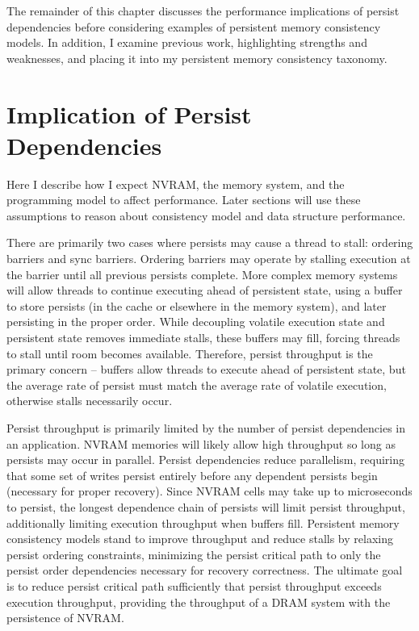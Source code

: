 The remainder of this chapter discusses the performance implications of persist dependencies before considering examples of persistent memory consistency models.
In addition, I examine previous work, highlighting strengths and weaknesses, and placing it into my persistent memory consistency taxonomy.

\section{Implication of Persist Dependencies}
\label{sec:PMC:Performance}

Here I describe how I expect NVRAM, the memory system, and the programming model to affect performance.
Later sections will use these assumptions to reason about consistency model and data structure performance.

There are primarily two cases where persists may cause a thread to stall: ordering barriers and sync barriers.
Ordering barriers may operate by stalling execution at the barrier until all previous persists complete.
More complex memory systems will allow threads to continue executing ahead of persistent state, using a buffer to store persists (in the cache or elsewhere in the memory system), and later persisting in the proper order.
While decoupling volatile execution state and persistent state removes immediate stalls, these buffers may fill, forcing threads to stall until room becomes available.
Therefore, persist throughput is the primary concern -- buffers allow threads to execute ahead of persistent state, but the average rate of persist must match the average rate of volatile execution, otherwise stalls necessarily occur.

Persist throughput is primarily limited by the number of persist dependencies in an application.
NVRAM memories will likely allow high throughput so long as persists may occur in parallel.
Persist dependencies reduce parallelism, requiring that some set of writes persist entirely before any dependent persists begin (necessary for proper recovery).
Since NVRAM cells may take up to microseconds to persist, the longest dependence chain of persists will limit persist throughput, additionally limiting execution throughput when buffers fill.
Persistent memory consistency models stand to improve throughput and reduce stalls by relaxing persist ordering constraints, minimizing the persist critical path to only the persist order dependencies necessary for recovery correctness.
The ultimate goal is to reduce persist critical path sufficiently that persist throughput exceeds execution throughput, providing the throughput of a DRAM system with the persistence of NVRAM.

